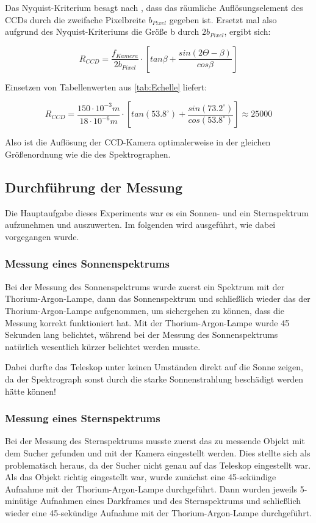 Das Nyquist-Kriterium besagt nach \cite{ronomischesPraktikum}, dass das räumliche Auflösungselement des CCDs durch die zweifache Pixelbreite $ b_{Pixel} $ gegeben ist. Ersetzt mal also aufgrund des Nyquist-Kriteriums die Größe b durch $ 2b_{Pixel} $, ergibt sich:

\begin{equation}
R_{CCD} = \frac{f_{Kamera}}{2b_{Pixel}}\cdot \left[tan \beta + \frac{sin(2\Theta-\beta)}{cos \beta}\right]
\end{equation}

Einsetzen von Tabellenwerten aus \ref{tab:Echelle} liefert:
 
\begin{equation}
R_{CCD} = \frac{150\cdot10^{-3}m}{18\cdot10^{-6}m}\cdot \left[tan (53.8^{\circ}) + \frac{sin(73.2^{\circ})}{cos (53.8^{\circ})}\right] \approx 25000
\end{equation}

Also ist die Auflösung der CCD-Kamera optimalerweise in der gleichen Größenordnung wie die des Spektrographen.
			
\subsection{Durchführung der Messung}
Die Hauptaufgabe dieses Experiments war es ein Sonnen- und ein Sternspektrum aufzunehmen und auszuwerten. Im folgenden wird ausgeführt, wie dabei vorgegangen wurde.

\subsubsection{Messung eines Sonnenspektrums}
Bei der Messung des Sonnenspektrums wurde zuerst ein Spektrum mit der Thorium-Argon-Lampe, dann das Sonnenspektrum und schließlich wieder das der Thorium-Argon-Lampe aufgenommen, um sichergehen zu können, dass die Messung korrekt funktioniert hat. Mit der Thorium-Argon-Lampe wurde 45 Sekunden lang belichtet, während bei der Messung des Sonnenspektrums natürlich wesentlich kürzer belichtet werden musste.

Dabei durfte das Teleskop unter keinen Umständen direkt auf die Sonne zeigen, da der Spektrograph sonst durch die starke Sonnenstrahlung beschädigt werden hätte können!

\subsubsection{Messung eines Sternspektrums}
Bei der Messung des Sternspektrums musste zuerst das zu messende Objekt mit dem Sucher gefunden und mit der Kamera eingestellt werden. Dies stellte sich als problematisch heraus, da der Sucher nicht genau auf das Teleskop eingestellt war. Als das Objekt richtig eingestellt war, wurde zunächst eine 45-sekündige Aufnahme mit der Thorium-Argon-Lampe durchgeführt. Dann wurden jeweils 5-minütige Aufnahmen eines Darkframes und des Sternspektrums und schließlich wieder eine 45-sekündige Aufnahme mit der Thorium-Argon-Lampe durchgeführt.

